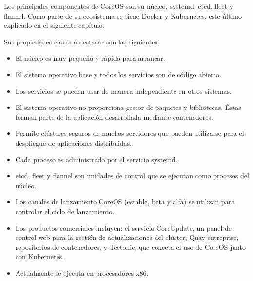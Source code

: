 Los principales componentes de CoreOS son su núcleo, systemd, etcd, fleet y flannel. Como parte de su ecosistema se tiene Docker y Kubernetes, este último explicado en el siguiente capítulo.

Sus propiedades claves a destacar son las siguientes:

\begin{itemize}
\item El núcleo es muy pequeño y rápido para arrancar.
\item El sistema operativo base y todos los servicios son de código abierto.
\item Los servicios se pueden usar de manera independiente en otros sistemas.
\item El sistema operativo no proporciona gestor de paquetes y bibliotecas. Éstas forman parte de la aplicación desarrollada mediante contenedores.
\item Permite clústeres seguros de muchos servidores que pueden utilizarse para el despliegue de aplicaciones distribuidas.
\item Cada proceso es administrado por el servicio systemd.
\item etcd, fleet y flannel son unidades de control que se ejecutan como procesos del núcleo.
\item Los canales de lanzamiento CoreOS (estable, beta y alfa) se utilizan para controlar el ciclo de lanzamiento.
\item Los productos comerciales incluyen: el servicio CoreUpdate, un panel de control web para la gestión de actualizaciones del clúster, Quay entreprise, repositorios de contenedores, y Tectonic, que conecta el uso de CoreOS junto con Kubernetes.
\item Actualmente se ejecuta en procesadores x86.
\end{itemize}


